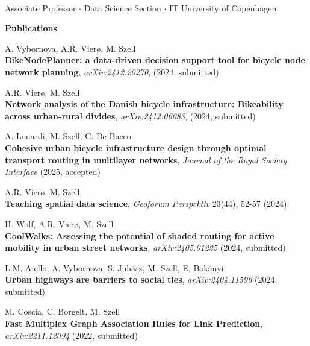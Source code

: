 \documentclass[10pt,a4paper]{article}
\def\name{Michael Szell}
\begin{document}
\begin{center}
 \\[8px]
 Associate Professor $\cdot$ Data Science Section $\cdot$ IT University of Copenhagen
\vspace{26.8pt}



\vspace{8pt}

{\large \bf Publications}
\end{center}

\begin{etaremune}
\item A. Vybornova, A.R. Vierø, M. Szell\\
\textbf{BikeNodePlanner: a data-driven decision support tool for bicycle node network planning},
\textit{arXiv:2412.20270}, (2024, submitted)
\item A.R. Vierø, M. Szell\\
\textbf{Network analysis of the Danish bicycle infrastructure: Bikeability across urban-rural divides},
\textit{arXiv:2412.06083}, (2024, submitted)
\item A. Lonardi, M. Szell, C. De Bacco\\
    \textbf{Cohesive urban bicycle infrastructure design through optimal transport routing in multilayer networks}, 
    \textit{Journal of the Royal Society Interface} (2025, accepted)
\item A.R. Vierø, M. Szell\\
\textbf{Teaching spatial data science}, \textit{Geoforum Perspektiv} 23(44), 52-57 (2024)
\item H. Wolf, A.R. Vierø, M. Szell\\
    \textbf{CoolWalks: Assessing the potential of shaded routing for active mobility in urban street networks}, 
    \textit{arXiv:2405.01225} (2024, submitted)
\item L.M. Aiello, A. Vybornova, S. Juhász, M. Szell, E. Bokányi\\
    \textbf{Urban highways are barriers to social ties}, 
    \textit{arXiv:2404.11596} (2024, submitted)
\item M. Coscia, C. Borgelt, M. Szell\\
    \textbf{Fast Multiplex Graph Association Rules for Link Prediction}, 
    \textit{arXiv:2211.12094} (2022, submitted)

\end{etaremune}
\end{document}
